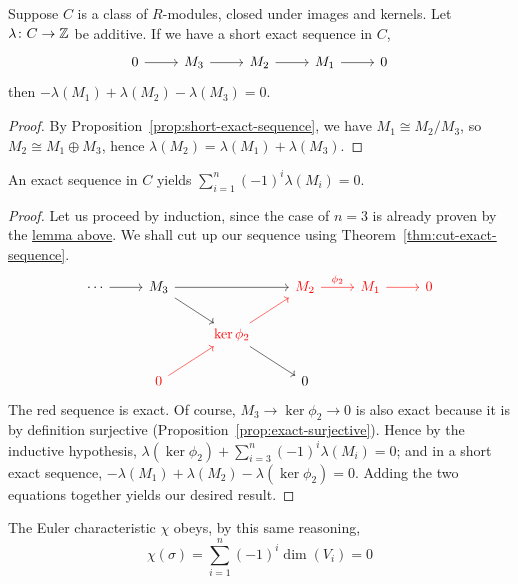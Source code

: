 \begin{lemma}\label{lem:additive-characteristic}
    Suppose \(C\) is a class of \(R\)-modules,
    closed under images and kernels.
    Let \(\lambda\colon C\to\mathbb{Z}\) be additive.
    If we have a short exact sequence in \(C\),
    \begin{equation*}
        \begin{tikzcd}
            0 \arrow{r} & M_3 \arrow{r} & M_2 \arrow{r} & M_1 \arrow{r} & 0
        \end{tikzcd}
    \end{equation*}
    then \(-\lambda(M_1) + \lambda(M_2) - \lambda(M_3) = 0\).
\end{lemma}
\begin{proof}
    By Proposition~\ref{prop:short-exact-sequence}, we have \(M_1 \cong M_2/M_3\),
    so \(M_2 \cong M_1 \oplus M_3\), hence \(\lambda(M_2) = \lambda(M_1) + \lambda(M_3)\).
\end{proof}
\begin{theorem}\label{thm:additive-characteristic}
    An exact sequence in \(C\) yields \(\sum_{i=1}^n {(-1)}^i \lambda(M_i) = 0\).
\end{theorem}
\begin{proof}
    Let us proceed by induction,
    since the case of \(n=3\) is already proven
    by the \hyperref[lem:additive-characteristic]{lemma above}.
    We shall cut up our sequence using Theorem~\ref{thm:cut-exact-sequence}.
    \begin{equation*}
        \begin{tikzcd}
            \cdots \arrow{r} & M_3 \arrow{rr} \arrow{rd} &&
            \textcolor{red}{M_2} \arrow[color=red]{r}{\phi_2} &
            \textcolor{red}{M_1} \arrow[color=red]{r} & \textcolor{red}{0} \\
            && \textcolor{red}{\ker\phi_2} \arrow[color=red]{ru} \arrow{rd} \\
            & \textcolor{red}{0} \arrow[color=red]{ru} && 0
        \end{tikzcd}
    \end{equation*}
    The red sequence is exact.
    Of course, \(M_3 \to \ker\phi_2 \to 0\) is also exact
    because it is by definition surjective (Proposition~\ref{prop:exact-surjective}).
    Hence by the inductive hypothesis,
    \(\lambda(\ker\phi_2) + \sum_{i=3}^n {(-1)}^i \lambda(M_i) = 0\);
    and in a short exact sequence,
    \(-\lambda(M_1) + \lambda(M_2) - \lambda(\ker\phi_2) = 0\).
    Adding the two equations together yields our desired result.
\end{proof}
\begin{remark}
    The Euler characteristic \(\chi\) obeys, by this same reasoning,
    \begin{equation*}
        \chi(\sigma) = \sum_{i=1}^n {(-1)}^i \dim(V_i) = 0
    \end{equation*}
\end{remark}

